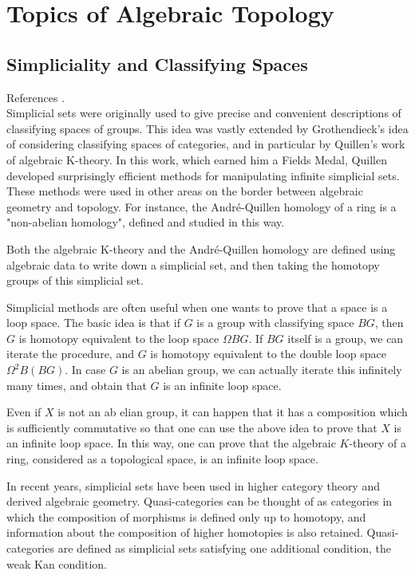 \part{Topics of Algebraic Topology}

\chapter{Simpliciality and Classifying Spaces}
References \cite{richterCategoriesHomotopyTheory2020,goerssSimplicialHomotopyTheory2009,hatcherAlgebraicTopology2021}. \\

Simplicial sets were originally used to give precise and convenient descriptions of classifying spaces of groups. This idea was vastly extended by Grothendieck's idea of considering classifying spaces of categories, and in particular by Quillen's work of algebraic K-theory. In this work, which earned him a Fields Medal, Quillen developed surprisingly efficient methods for manipulating infinite simplicial sets. These methods were used in other areas on the border between algebraic geometry and topology. For instance, the André-Quillen homology of a ring is a "non-abelian homology", defined and studied in this way.

Both the algebraic K-theory and the André-Quillen homology are defined using algebraic data to write down a simplicial set, and then taking the homotopy groups of this simplicial set.

Simplicial methods are often useful when one wants to prove that a space is a loop space. The basic idea is that if $G$ is a group with classifying space $B G$, then $G$ is homotopy equivalent to the loop space $\Omega B G$. If $B G$ itself is a group, we can iterate the procedure, and $G$ is homotopy equivalent to the double loop space $\Omega^2 B(B G)$. In case $G$ is an abelian group, we can actually iterate this infinitely many times, and obtain that $G$ is an infinite loop space.

Even if $X$ is not an ab elian group, it can happen that it has a composition which is sufficiently commutative so that one can use the above idea to prove that $X$ is an infinite loop space. In this way, one can prove that the algebraic $K$-theory of a ring, considered as a topological space, is an infinite loop space.

In recent years, simplicial sets have been used in higher category theory and derived algebraic geometry. Quasi-categories can be thought of as categories in which the composition of morphisms is defined only up to homotopy, and information about the composition of higher homotopies is also retained. Quasi-categories are defined as simplicial sets satisfying one additional condition, the weak Kan condition.

